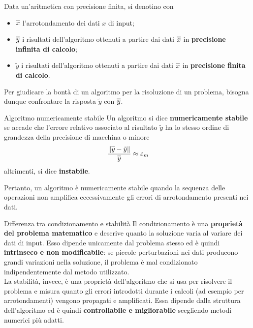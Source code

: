 Data un'aritmetica con precisione finita, si denotino con
\begin{itemize}
    \item $\overline{x\vphantom{\rule{0pt}{1.2ex}}}$ l'arrotondamento dei dati $x$ di input;
    \item $\overline{y\vphantom{\rule{0pt}{1.2ex}}}$ i risultati dell'algoritmo ottenuti a partire
    dai dati $\overline{x\vphantom{\rule{0pt}{1.2ex}}}$ in \textbf{precisione infinita di calcolo};
    \item $\tilde{y}$ i risultati dell'algoritmo ottenuti a partire dai dati
    $\overline{x\vphantom{\rule{0pt}{1.2ex}}}$ in \textbf{precisione finita di calcolo}.
\end{itemize}

Per giudicare la bontà di un algoritmo per la risoluzione di un problema, bisogna dunque confrontare
la risposta $\tilde{y}$ con $\overline{y\vphantom{\rule{0pt}{1.2ex}}}$.
\begin{definition}{Algoritmo numericamente stabile}
    Un algoritmo si dice \textbf{numericamente stabile} se accade che l'errore relativo associato
    al risultato $\tilde{y}$ ha lo stesso ordine di grandezza della precisione di macchina o minore
    \[\frac{\|\overline{y\vphantom{\rule{0pt}{1.2ex}}}-\tilde{y}\|}
    {\overline{y\vphantom{\rule{0pt}{1.2ex}}}}\approx\varepsilon_m\]
    altrimenti, si dice \textbf{instabile}.
\end{definition}

Pertanto, un algoritmo è numericamente stabile quando la sequenza delle operazioni non amplifica
eccessivamente gli errori di arrotondamento presenti nei dati.

\begin{observation}{Differenza tra condizionamento e stabilità}
    Il condizionamento è una \textbf{proprietà del problema matematico} e descrive quanto la soluzione varia al
    variare dei dati di input. Esso dipende unicamente dal problema stesso ed è quindi \textbf{intrinseco
    e non modificabile}: se piccole perturbazioni nei dati producono grandi variazioni nella soluzione,
    il problema è mal condizionato indipendentemente dal metodo utilizzato.\\

    La stabilità, invece, è una proprietà dell’algoritmo che si usa per risolvere il problema e
    misura quanto gli errori introdotti durante i calcoli (ad esempio per arrotondamenti) vengono
    propagati e amplificati. Essa dipende dalla struttura dell’algoritmo ed è quindi \textbf{controllabile e
    migliorabile} scegliendo metodi numerici più adatti.
\end{observation}
